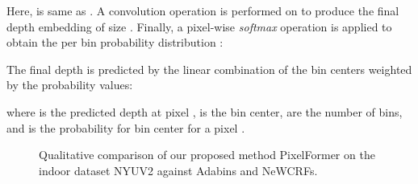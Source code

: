 \documentclass[10pt,twocolumn,letterpaper]{article}
\begin{document}
Here,  is same as . A convolution operation is performed on  to produce the final depth embedding  of size . Finally, a pixel-wise \emph{softmax} operation is applied to obtain the per bin probability distribution :

The final depth is predicted by the linear combination of the bin centers weighted by the probability values:

where  is the predicted depth at pixel ,  is the  bin center,  are the number of bins, and  is the probability for bin center  for a pixel .

\begin{figure*}
	\begin{center}
		\setlength\tabcolsep{2pt}
		\caption{Qualitative comparison of our proposed method PixelFormer on the indoor dataset NYUV2 against Adabins and NeWCRFs.}
		\vspace{-1.5em}
		\label{fig:nyu}
	\end{center}
\end{figure*}
 
\end{document}
